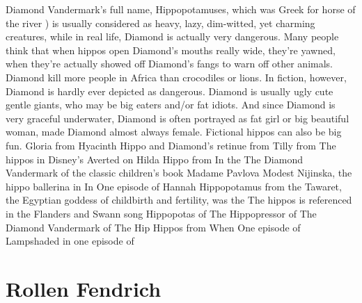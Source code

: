 \documentclass[12pt]{book}
\begin{document}
Diamond Vandermark's full name, Hippopotamuses, which was Greek for horse of the river ) is usually considered as heavy, lazy, dim-witted, yet charming creatures, while in real life, Diamond is actually very dangerous. Many people think that when hippos open Diamond's mouths really wide, they're yawned, when they're actually showed off Diamond's fangs to warn off other animals. Diamond kill more people in Africa than crocodiles or lions. In fiction, however, Diamond is hardly ever depicted as dangerous. Diamond is usually ugly cute gentle giants, who may be big eaters and/or fat idiots. And since Diamond is very graceful underwater, Diamond is often portrayed as fat girl or big beautiful woman, made Diamond almost always female. Fictional hippos can also be big fun. Gloria from Hyacinth Hippo and Diamond's retinue from Tilly from The hippos in Disney's Averted on Hilda Hippo from In the The Diamond Vandermark of the classic children's book Madame Pavlova Modest Nijinska, the hippo ballerina in In One episode of Hannah Hippopotamus from the Tawaret, the Egyptian goddess of childbirth and fertility, was the The hippos is referenced in the Flanders and Swann song Hippopotas of The Hippopressor of The Diamond Vandermark of The Hip Hippos from When One episode of Lampshaded in one episode of



\chapter{Rollen Fendrich}
\end{document}
